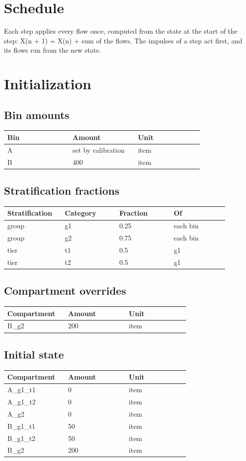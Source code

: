 \documentclass{article}
\begin{document}
\section*{Schedule}
Each step applies every flow once, computed from the state at the start of the step: X(n + 1) = X(n) + sum of the flows. The impulses of a step act first, and its flows run from the new state.

\section*{Initialization}
\subsection*{Bin amounts}
\begin{longtable}{p{0.3\linewidth}p{0.3\linewidth}p{0.3\linewidth}}
Bin & Amount & Unit \\
\hline
\endhead
A & set by calibration & item \\
B & 400 & item \\
\end{longtable}
\subsection*{Stratification fractions}
\begin{longtable}{p{0.225\linewidth}p{0.225\linewidth}p{0.225\linewidth}p{0.225\linewidth}}
Stratification & Category & Fraction & Of \\
\hline
\endhead
group & g1 & 0.25 & each bin \\
group & g2 & 0.75 & each bin \\
tier & t1 & 0.5 & g1 \\
tier & t2 & 0.5 & g1 \\
\end{longtable}
\subsection*{Compartment overrides}
\begin{longtable}{p{0.3\linewidth}p{0.3\linewidth}p{0.3\linewidth}}
Compartment & Amount & Unit \\
\hline
\endhead
B\_g2 & 200 & item \\
\end{longtable}
\subsection*{Initial state}
\begin{longtable}{p{0.3\linewidth}p{0.3\linewidth}p{0.3\linewidth}}
Compartment & Amount & Unit \\
\hline
\endhead
A\_g1\_t1 & 0 & item \\
A\_g1\_t2 & 0 & item \\
A\_g2 & 0 & item \\
B\_g1\_t1 & 50 & item \\
B\_g1\_t2 & 50 & item \\
B\_g2 & 200 & item \\
\end{longtable}
\end{document}
